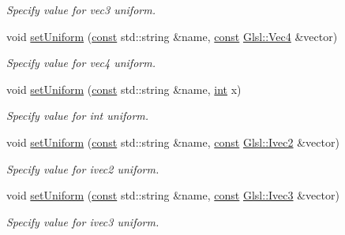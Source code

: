 \begin{DoxyCompactItemize}
\begin{DoxyCompactList}\small\item\em Specify value for {\ttfamily vec3} uniform. \end{DoxyCompactList}\item 
void \hyperlink{classsf_1_1_shader_abc1aee8343800680fd62e1f3d43c24bf}{set\-Uniform} (\hyperlink{term__entry_8h_a57bd63ce7f9a353488880e3de6692d5a}{const} std\-::string \&name, \hyperlink{term__entry_8h_a57bd63ce7f9a353488880e3de6692d5a}{const} \hyperlink{namespacesf_1_1_glsl_a862f8df4771d2403de28653328fac5d0}{Glsl\-::\-Vec4} \&vector)
\begin{DoxyCompactList}\small\item\em Specify value for {\ttfamily vec4} uniform. \end{DoxyCompactList}\item 
void \hyperlink{classsf_1_1_shader_ae4fc8b4c18e6b653952bce5c8c81e4a0}{set\-Uniform} (\hyperlink{term__entry_8h_a57bd63ce7f9a353488880e3de6692d5a}{const} std\-::string \&name, \hyperlink{term__entry_8h_ad65b480f8c8270356b45a9890f6499ae}{int} x)
\begin{DoxyCompactList}\small\item\em Specify value for {\ttfamily int} uniform. \end{DoxyCompactList}\item 
void \hyperlink{classsf_1_1_shader_a2ccb5bae59cedc7d6a9b533c97f7d1ed}{set\-Uniform} (\hyperlink{term__entry_8h_a57bd63ce7f9a353488880e3de6692d5a}{const} std\-::string \&name, \hyperlink{term__entry_8h_a57bd63ce7f9a353488880e3de6692d5a}{const} \hyperlink{namespacesf_1_1_glsl_aab803ee70c4b7bfcd63ec09e10408fd3}{Glsl\-::\-Ivec2} \&vector)
\begin{DoxyCompactList}\small\item\em Specify value for {\ttfamily ivec2} uniform. \end{DoxyCompactList}\item 
void \hyperlink{classsf_1_1_shader_a9e328e3e97cd753fdc7b842f4b0f202e}{set\-Uniform} (\hyperlink{term__entry_8h_a57bd63ce7f9a353488880e3de6692d5a}{const} std\-::string \&name, \hyperlink{term__entry_8h_a57bd63ce7f9a353488880e3de6692d5a}{const} \hyperlink{namespacesf_1_1_glsl_a64f403dd0219e7f128ffddca641394df}{Glsl\-::\-Ivec3} \&vector)
\begin{DoxyCompactList}\small\item\em Specify value for {\ttfamily ivec3} uniform. \end{DoxyCompactList}\item 

\end{DoxyCompactItemize}
